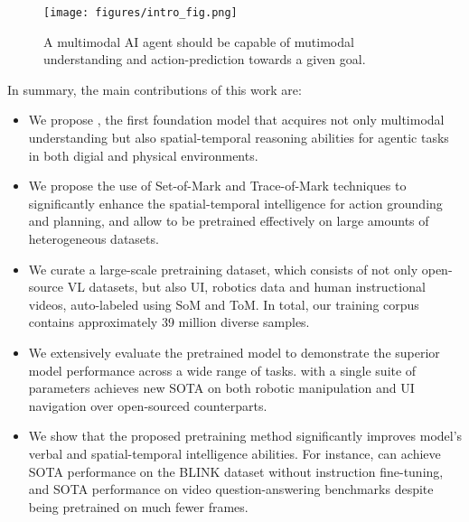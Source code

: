 \begin{figure}
    \centering
    \texttt{[image: figures/intro\_fig.png]}
    \caption{A multimodal AI agent should be capable of mutimodal understanding and action-prediction towards a given goal.}
    \label{fig:intro}
    \vspace{-0.5cm}
\end{figure}
In summary, the main contributions of this work are:
\begin{itemize}
    \item We propose \magma, the first foundation model that acquires not only multimodal understanding but also spatial-temporal reasoning abilities for agentic tasks in both digial and physical environments. 
    \item We propose the use of Set-of-Mark and Trace-of-Mark techniques to significantly enhance the spatial-temporal intelligence for action grounding and planning, and allow \magma to be pretrained effectively on large amounts of heterogeneous datasets. %
    \item We curate a large-scale pretraining dataset, which consists of not only open-source VL datasets, but also UI, robotics data and human instructional videos, auto-labeled using SoM and ToM. In total, our training corpus contains approximately 39 million diverse samples.
    \item We extensively evaluate the pretrained \magma model to demonstrate the superior model performance across a wide range of tasks. \magma with a single suite of parameters achieves new SOTA on both robotic manipulation and UI navigation over open-sourced counterparts.    
    \item We show that the proposed \magma pretraining method significantly improves model's verbal and spatial-temporal intelligence abilities. For instance, \magma can achieve SOTA performance on the BLINK dataset without instruction fine-tuning, and SOTA performance on video question-answering benchmarks despite being pretrained on much fewer frames. 
    
\end{itemize}